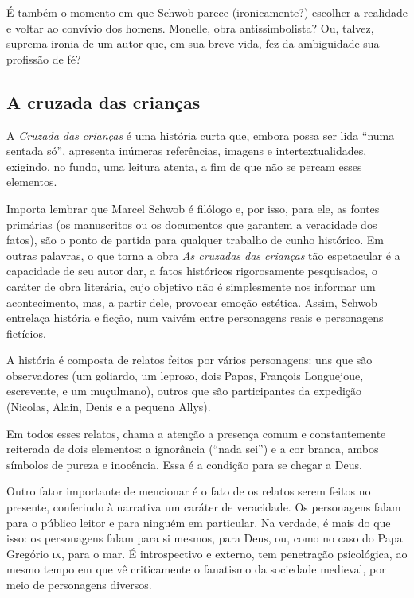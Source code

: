 É também o momento em que Schwob parece (ironicamente?) escolher a realidade
e voltar ao convívio dos homens. Monelle, obra antissimbolista? Ou, talvez,
suprema ironia de um autor que, em sua breve vida, fez da ambiguidade sua
profissão de fé?

\subsection{A cruzada das crianças}

A \textit{Cruzada das crianças} é uma história curta que, embora possa ser lida
``numa sentada só'', apresenta inúmeras referências, imagens e
intertextualidades, exigindo, no fundo, uma leitura atenta, a fim de que
não se percam esses elementos.

Importa lembrar que Marcel Schwob é filólogo e, por isso, para ele, as
fontes primárias (os manuscritos ou os documentos que garantem a
veracidade dos fatos), são o ponto de partida para qualquer trabalho de
cunho histórico. Em outras palavras, o que torna a obra \textit{As cruzadas das
crianças} tão espetacular é a capacidade de seu autor dar, a fatos
históricos rigorosamente pesquisados, o caráter de obra literária, cujo
objetivo não é simplesmente nos informar um acontecimento, mas, a partir
dele, provocar emoção estética. Assim, Schwob entrelaça história e
ficção, num vaivém entre personagens reais e personagens fictícios.

A história é composta de relatos feitos por vários personagens: uns que
são observadores (um goliardo, um leproso, dois Papas, François
Longuejoue, escrevente, e um muçulmano), outros que são participantes da
expedição (Nicolas, Alain, Denis e a pequena Allys).

Em todos esses relatos, chama a atenção a presença comum e
constantemente reiterada de dois elementos: a ignorância (``nada sei'')
e a cor branca, ambos símbolos de pureza e inocência. Essa é a condição
para se chegar a Deus.

Outro fator importante de mencionar é o fato de os relatos serem feitos
no presente, conferindo à narrativa um caráter de veracidade. Os
personagens falam para o público leitor e para ninguém em particular. Na
verdade, é mais do que isso: os personagens falam para si mesmos, para
Deus, ou, como no caso do Papa Gregório \textsc{ix}, para o mar. É introspectivo
e externo, tem penetração psicológica, ao mesmo tempo em que vê
criticamente o fanatismo da sociedade medieval, por meio de personagens
diversos.

